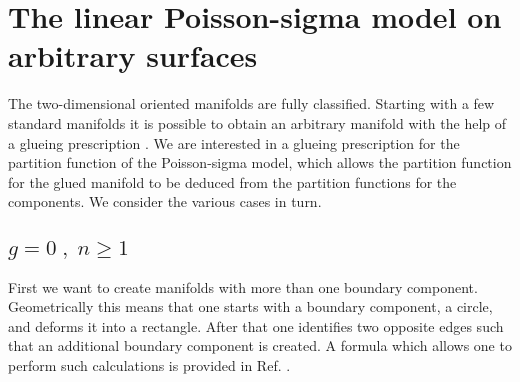 \documentclass[a4paper,twoside,11pt]{article}
\numberwithin{equation}{section}
\begin{document}
\section{The linear Poisson-sigma model on arbitrary surfaces}
%
%
The two-dimensional oriented manifolds are fully classified. Starting with a few standard manifolds it 
is possible to obtain an arbitrary manifold with the help of a glueing prescription \cite{M}. We are 
interested in a glueing prescription for 
the partition function of the Poisson-sigma model, which allows the partition function for the glued manifold to be deduced from the partition functions for the components. We consider the various cases in turn. 
%
%
\subsection{$g=0\;,\;n\geq 1$}
%
First we want to create manifolds with more than one boundary component. Geometrically this means that one
starts with a boundary component, a circle, and deforms it into a rectangle. After that one identifies two 
opposite edges such that an additional 
boundary component is created. A formula which allows one to perform such calculations is provided in Ref. \cite{W}.
\end{document}

